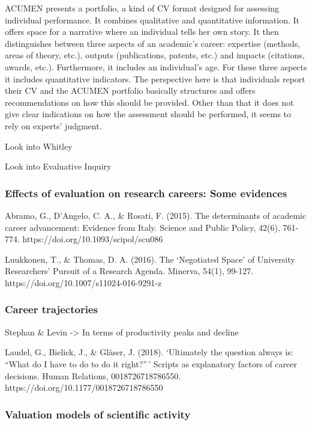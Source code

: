\documentclass[]{elsarticle} %
\begin{document}
ACUMEN presents a portfolio, a kind of CV format designed for assessing
individual performance. It combines qualitative and quantitative
information. It offers space for a narrative where an individual tells
her own story. It then distinguishes between three aspects of an
academic's career: expertise (methods, areas of theory, etc.), outputs
(publications, patents, etc.) and impacts (citations, awards, etc.).
Furthermore, it includes an individual's age. For these three aspects it
includes quantitative indicators. The perspective here is that
individuals report their CV and the ACUMEN portfolio basically
structures and offers recommendations on how this should be provided.
Other than that it does not give clear indications on how the assessment
should be performed, it seems to rely on experts' judgment.

Look into Whitley

Look into Evaluative Inquiry

\hypertarget{effects-of-evaluation-on-research-careers-some-evidences}{%
\subsubsection{Effects of evaluation on research careers: Some
evidences}\label{effects-of-evaluation-on-research-careers-some-evidences}}

Abramo, G., D'Angelo, C. A., \& Rosati, F. (2015). The determinants of
academic career advancement: Evidence from Italy. Science and Public
Policy, 42(6), 761-774. https://doi.org/10.1093/scipol/scu086

Luukkonen, T., \& Thomas, D. A. (2016). The `Negotiated Space' of
University Researchers' Pursuit of a Research Agenda. Minerva, 54(1),
99-127. https://doi.org/10.1007/s11024-016-9291-z

\hypertarget{career-trajectories}{%
\subsubsection{Career trajectories}\label{career-trajectories}}

Stephan \& Levin -\textgreater{} In terms of productivity peaks and
decline

Laudel, G., Bielick, J., \& Gläser, J. (2018). `Ultimately the question
always is: ``What do I have to do to do it right?''\,' Scripts as
explanatory factors of career decisions. Human Relations,
0018726718786550. https://doi.org/10.1177/0018726718786550

\hypertarget{valuation-models-of-scientific-activity}{%
\subsubsection{Valuation models of scientific
activity}\label{valuation-models-of-scientific-activity}}
\end{document}
